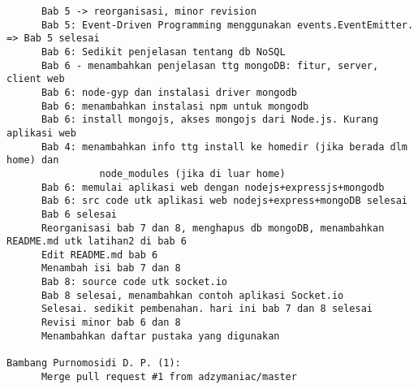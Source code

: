 \begin{lstlisting}
      Bab 5 -> reorganisasi, minor revision
      Bab 5: Event-Driven Programming menggunakan events.EventEmitter. => Bab 5 selesai
      Bab 6: Sedikit penjelasan tentang db NoSQL
      Bab 6 - menambahkan penjelasan ttg mongoDB: fitur, server, client web
      Bab 6: node-gyp dan instalasi driver mongodb
      Bab 6: menambahkan instalasi npm untuk mongodb
      Bab 6: install mongojs, akses mongojs dari Node.js. Kurang aplikasi web
      Bab 4: menambahkan info ttg install ke homedir (jika berada dlm home) dan 
				node_modules (jika di luar home)
      Bab 6: memulai aplikasi web dengan nodejs+expressjs+mongodb
      Bab 6: src code utk aplikasi web nodejs+express+mongoDB selesai
      Bab 6 selesai
      Reorganisasi bab 7 dan 8, menghapus db mongoDB, menambahkan README.md utk latihan2 di bab 6
      Edit README.md bab 6
      Menambah isi bab 7 dan 8
      Bab 8: source code utk socket.io
      Bab 8 selesai, menambahkan contoh aplikasi Socket.io
      Selesai. sedikit pembenahan. hari ini bab 7 dan 8 selesai
      Revisi minor bab 6 dan 8
      Menambahkan daftar pustaka yang digunakan

Bambang Purnomosidi D. P. (1):
      Merge pull request #1 from adzymaniac/master
\end{lstlisting}

